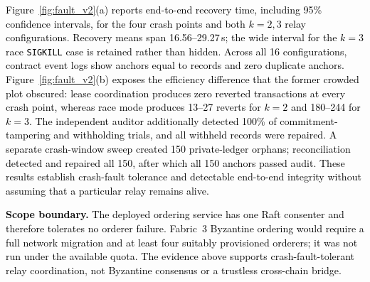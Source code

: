 \documentclass[final,5p,times,twocolumn]{elsarticle}
\begin{document}
\begin{table}[!htbp]
\centering
\caption{\textcolor{black}{Relay drain rate $\mu_{\mathrm{relay}}$ (anchors/s, mean $\pm$ 95\% CI over five repetitions) under emulated public-chain congestion, with the prediction $k/B$ in parentheses. $B$ is the fixed block interval; each run drains 20 outbox rows with $k$ lease relays.}}
\label{tab:congestion}
\setlength{\tabcolsep}{3pt}
\end{table}


\textcolor{black}{Figure~\ref{fig:fault_v2}(a) reports end-to-end recovery time, including 95\% confidence intervals, for the four crash points and both $k=2,3$ relay configurations. Recovery means span 16.56--29.27\,s; the wide interval for the $k=3$ race \texttt{SIGKILL} case is retained rather than hidden. Across all 16 configurations, contract event logs show anchors equal to records and zero duplicate anchors. Figure~\ref{fig:fault_v2}(b) exposes the efficiency difference that the former crowded plot obscured: lease coordination produces zero reverted transactions at every crash point, whereas race mode produces 13--27 reverts for $k=2$ and 180--244 for $k=3$. The independent auditor additionally detected 100\% of commitment-tampering and withholding trials, and all withheld records were repaired. A separate crash-window sweep created 150 private-ledger orphans; reconciliation detected and repaired all 150, after which all 150 anchors passed audit. These results establish crash-fault tolerance and detectable end-to-end integrity without assuming that a particular relay remains alive.}



\textcolor{black}{\textbf{Scope boundary.} The deployed ordering service has one Raft consenter and therefore tolerates no orderer failure. Fabric~3 Byzantine ordering would require a full network migration and at least four suitably provisioned orderers; it was not run under the available quota. The evidence above supports crash-fault-tolerant relay coordination, not Byzantine consensus or a trustless cross-chain bridge.}
\end{document}
